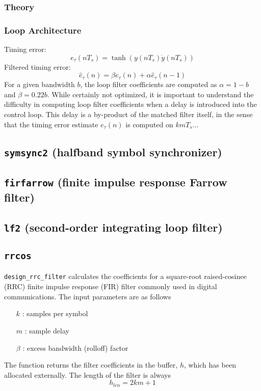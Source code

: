 \subsubsection{Theory}

\subsubsection{Loop Architecture}
Timing error:
\[
    e_\tau(nT_s) = \tanh\left( y(nT_s)\dot{y}(nT_s) \right)
\]
Filtered timing error:
\[
    \hat{e}_\tau(n) = \beta e_\tau(n) + \alpha \hat{e}_\tau(n-1)
\]
For a given bandwidth $b$, the loop filter coefficients are computed as
$\alpha = 1-b$ and $\beta = 0.22b$.
While certainly not optimized, it is important to understand the difficulty in
computing loop filter coefficients when a delay is introduced into the control
loop.
This delay is a by-product of the matched filter itself, in the sense that the
timing error estimate $e_\tau(n)$ is computed on $k m T_s$...

\subsection{{\tt symsync2} (halfband symbol synchronizer)}

\subsection{{\tt firfarrow} (finite impulse response Farrow filter)}

\subsection{{\tt lf2} (second-order integrating loop filter)}

\subsection{{\tt rrcos}}
{\tt design\_rrc\_filter} calculates the coefficients for a square-root
raised-cosinee (RRC) finite impulse response (FIR) filter commonly used in
digital communications.
The input parameters are as follows
\begin{itemize}
    \item[$k$] : samples per symbol
    \item[$m$] : sample delay
    \item[$\beta$] : excess bandwidth (rolloff) factor
\end{itemize}
The function returns the filter coefficients in the buffer, $h$, which has been
allocated externally.  The length of the filter is always
\[
    h_{len} = 2 k m + 1
\]

